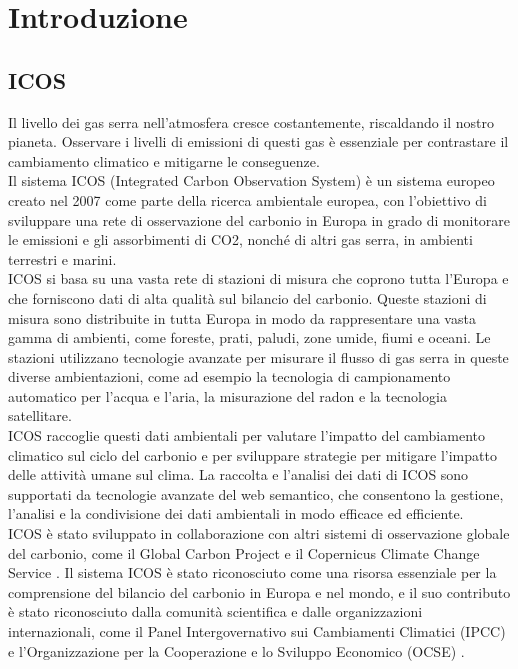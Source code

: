 \chapter{Introduzione}
\section{ICOS}

Il livello dei gas serra nell'atmosfera cresce costantemente, riscaldando il nostro pianeta. Osservare 
i livelli di emissioni di questi gas è essenziale per contrastare il cambiamento climatico e mitigarne le 
conseguenze. \\

Il sistema ICOS (Integrated Carbon Observation System) \cite{ICOSHomepage} è un sistema europeo creato nel 2007 come parte della ricerca 
ambientale europea, con l'obiettivo di sviluppare una rete di osservazione del carbonio in Europa
in grado di monitorare le emissioni e gli assorbimenti di CO2, nonché di altri gas serra,
in ambienti terrestri e marini. \\

ICOS si basa su una vasta rete di stazioni di misura che coprono tutta l'Europa e che forniscono 
dati di alta qualità sul bilancio del carbonio. Queste stazioni di misura sono distribuite in 
tutta Europa in modo da rappresentare una vasta gamma di ambienti, come foreste, prati, paludi,
zone umide, fiumi e oceani. Le stazioni utilizzano tecnologie avanzate per misurare il flusso
di gas serra in queste diverse ambientazioni, come ad esempio la tecnologia di campionamento 
automatico per l'acqua e l'aria, la misurazione del radon e la tecnologia satellitare.\\

ICOS raccoglie questi dati ambientali per valutare l'impatto del cambiamento climatico
sul ciclo del carbonio e per sviluppare strategie per mitigare l'impatto delle attività
umane sul clima. La raccolta e l'analisi dei dati di ICOS sono supportati da tecnologie 
avanzate del web semantico, che consentono la gestione, l'analisi e la condivisione dei dati 
ambientali in modo efficace ed efficiente. \\

ICOS è stato sviluppato in collaborazione con altri sistemi di osservazione globale del carbonio,
come il Global Carbon Project \cite{GlobalCarbonProjectHomepage} e il Copernicus Climate Change Service \cite{CopernicusClimateChnageService}.
Il sistema ICOS è stato riconosciuto come una risorsa essenziale per la comprensione
del bilancio del carbonio in Europa e nel mondo, e il suo contributo è stato riconosciuto
dalla comunità scientifica e dalle organizzazioni internazionali, come il Panel Intergovernativo
sui Cambiamenti Climatici (IPCC) \cite{IPCCHomepage} e l'Organizzazione per la Cooperazione e lo Sviluppo Economico (OCSE) \cite{OCSEHomepage}.\\

